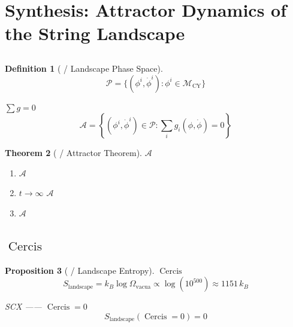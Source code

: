 \documentclass[12pt,a4paper]{article}
\theoremstyle{plain}
\newtheorem{theorem}{ Theorem}[section]
\newtheorem{proposition}[theorem]{ Proposition}
\theoremstyle{definition}
\newtheorem{definition}[theorem]{ Definition}
\newcommand{\M}{\mathcal{M}}
\newcommand{\Acal}{\mathcal{A}}
\newcommand{\Pcal}{\mathcal{P}}
\DeclareMathOperator{\Cercis}{Cercis}
\begin{document}
\newpage


\section{}
\section*{Synthesis: Attractor Dynamics of the String Landscape}

\subsection{}

\begin{definition}[ / Landscape Phase Space]

\begin{equation}
    \Pcal = \{ (\phi^i, \dot{\phi}^i) : \phi^i \in \M_{\text{CY}} \}
\end{equation}

$\sum g = 0$ \textbf{}
\begin{equation}
    \Acal = \left\{ (\phi^i, \dot{\phi}^i) \in \Pcal : \sum_i g_i(\phi, \dot{\phi}) = 0 \right\}
\end{equation}
\end{definition}

\begin{theorem}[ / Attractor Theorem]
$\Acal$ \textbf{}
\begin{enumerate}
    \item \textbf{}  $\Acal$ 
    \item \textbf{}  $t \to \infty$  $\Acal$
    \item \textbf{} $\Acal$ 
\end{enumerate}
\end{theorem}

\subsection{ $\Cercis$}

\begin{proposition}[ / Landscape Entropy]
 $\Cercis$ 
\begin{equation}
    S_{\text{landscape}} = k_B \log \Omega_{\text{vacua}} \propto \log(10^{500}) \approx 1151 \, k_B
\end{equation}

 SCX \textbf{}——
$\Cercis = 0$ 
\begin{equation}
    S_{\text{landscape}}(\Cercis = 0) = 0
\end{equation}
\end{proposition}
\end{document}
